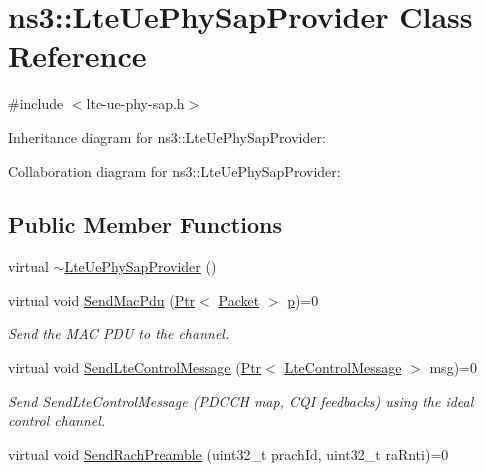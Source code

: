 \hypertarget{classns3_1_1LteUePhySapProvider}{}\section{ns3\+:\+:Lte\+Ue\+Phy\+Sap\+Provider Class Reference}
\label{classns3_1_1LteUePhySapProvider}


{\ttfamily \#include $<$lte-\/ue-\/phy-\/sap.\+h$>$}



Inheritance diagram for ns3\+:\+:Lte\+Ue\+Phy\+Sap\+Provider\+:


Collaboration diagram for ns3\+:\+:Lte\+Ue\+Phy\+Sap\+Provider\+:
\subsection*{Public Member Functions}
\begin{DoxyCompactItemize}
\item 
virtual \hyperlink{classns3_1_1LteUePhySapProvider_a82d6bc12b51dc20b4b06399d9942e1ca}{$\sim$\+Lte\+Ue\+Phy\+Sap\+Provider} ()
\item 
virtual void \hyperlink{classns3_1_1LteUePhySapProvider_a6ce4226c03154f4fb8b2b9f70e3241d4}{Send\+Mac\+Pdu} (\hyperlink{classns3_1_1Ptr}{Ptr}$<$ \hyperlink{classns3_1_1Packet}{Packet} $>$ \hyperlink{lte__link__budget__x2__handover__measures_8m_ac9de518908a968428863f829398a4e62}{p})=0
\begin{DoxyCompactList}\small\item\em Send the M\+AC P\+DU to the channel. \end{DoxyCompactList}\item 
virtual void \hyperlink{classns3_1_1LteUePhySapProvider_a03105b03c27915881faf0aed23ddbee8}{Send\+Lte\+Control\+Message} (\hyperlink{classns3_1_1Ptr}{Ptr}$<$ \hyperlink{classns3_1_1LteControlMessage}{Lte\+Control\+Message} $>$ msg)=0
\begin{DoxyCompactList}\small\item\em Send Send\+Lte\+Control\+Message (P\+D\+C\+CH map, C\+QI feedbacks) using the ideal control channel. \end{DoxyCompactList}\item 
virtual void \hyperlink{classns3_1_1LteUePhySapProvider_a3cbbcd0d60bf426d6da0484d4d015d39}{Send\+Rach\+Preamble} (uint32\+\_\+t prach\+Id, uint32\+\_\+t ra\+Rnti)=0
\end{DoxyCompactItemize}


